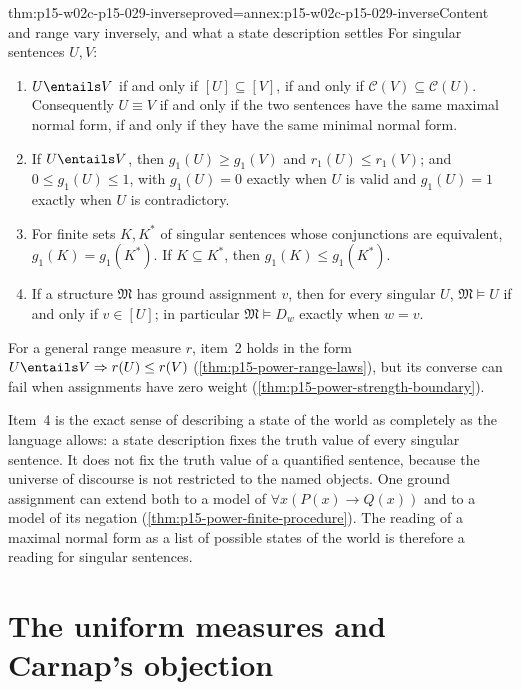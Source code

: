 \begin{hbtheorem}{thm:p15-w02c-p15-029-inverse}{proved=annex:p15-w02c-p15-029-inverse}{Content and range vary inversely, and what a state description settles}
For singular sentences \(U,V\):
\begin{enumerate}
\item \(U\entails V\) if and only if \([U]\subseteq[V]\), if and only if
  \(\mathcal C(V)\subseteq\mathcal C(U)\). Consequently \(U\equiv V\)
  if and only if the two sentences have the same maximal normal form, if
  and only if they have the same minimal normal form.
\item If \(U\entails V\), then \(g_1(U)\ge g_1(V)\) and
  \(r_1(U)\le r_1(V)\); and \(0\le g_1(U)\le1\), with \(g_1(U)=0\)
  exactly when \(U\) is valid and \(g_1(U)=1\) exactly when \(U\) is
  contradictory.
\item For finite sets \(K,K^\ast\) of singular sentences whose
  conjunctions are equivalent, \(g_1(K)=g_1(K^\ast)\). If
  \(K\subseteq K^\ast\), then \(g_1(K)\le g_1(K^\ast)\).
\item If a structure \(\mathfrak M\) has ground assignment \(v\), then
  for every singular \(U\), \(\mathfrak M\models U\) if and only if
  \(v\in[U]\); in particular \(\mathfrak M\models D_w\) exactly when
  \(w=v\).
\end{enumerate}
For a general range measure \(r\), item~2 holds in the form
\(U\entails V\Rightarrow r(U)\le r(V)\) (\cref{thm:p15-power-range-laws}),
but its converse can fail when assignments have zero weight
(\cref{thm:p15-power-strength-boundary}).
\end{hbtheorem}

Item~4 is the exact sense of describing a state of the world as
completely as the language allows: a state description fixes the truth
value of every singular sentence. It does not fix the truth value of a
quantified sentence, because the universe of discourse is not restricted
to the named objects. One ground assignment can extend both to a model
of \(\forall x(P(x)\to Q(x))\) and to a model of its negation
(\cref{thm:p15-power-finite-procedure}). The reading of a maximal normal
form as a list of possible states of the world is therefore a reading
for singular sentences.

\section{The uniform measures and Carnap's objection}
\label{sec:p15-w02c-p15-029-uniform}

